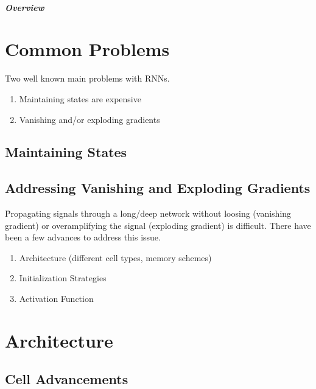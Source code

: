 \subparagraph{Overview}



\section{Common Problems}

Two well known main problems with RNNs.

\begin{enumerate}[noitemsep,topsep=0pt]
	\item Maintaining states are expensive
	\item Vanishing and/or exploding gradients
\end{enumerate}


\subsection{Maintaining States}


\subsection{Addressing Vanishing and Exploding Gradients}

\r{Propagating signals through a long/deep network without loosing (vanishing gradient) or overamplifying the signal (exploding gradient) is difficult.  There have been a few advances to address this issue.}

\begin{enumerate}[noitemsep,topsep=0pt]
	\item Architecture (different cell types, memory schemes)
	\item Initialization Strategies
	\item Activation Function
\end{enumerate}




\section{Architecture}




\subsection{Cell Advancements}

